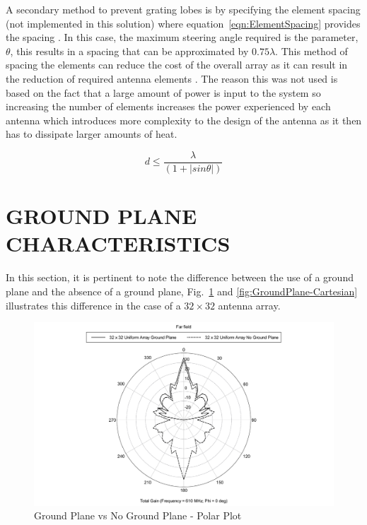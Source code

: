 \documentclass[11pt]{witseiepaper}
\begin{document}
\begin{bibunit}[witseie]
A secondary method to prevent grating lobes is by specifying the element spacing (not implemented in this solution) where equation~\ref{eqn:ElementSpacing} provides the spacing \cite[p.~331]{radarHandbook}. In this case, the maximum steering angle required is the parameter, $\theta$, this results in a spacing that can be approximated by $0.75 \lambda$. 
This method of spacing the elements can reduce the cost of the overall array as it can result in the reduction of required antenna elements \cite[p.~331]{radarHandbook}.
The reason this was not used is based on the fact that a large amount of power is input to the system so increasing the number of elements increases the power experienced by each antenna which introduces more complexity to the design of the antenna as it then has to dissipate larger amounts of heat.

\begin{equation} \label{eqn:ElementSpacing}
d \leq \frac{\lambda}{(1 + | sin \theta |)}
\end{equation}


\section{GROUND PLANE CHARACTERISTICS} \label{sec:GroundPlaneCharacteristics}
In this section, it is pertinent to note the difference between the use of a ground plane and the absence of a ground plane, Fig.~\ref{fig:GroundPlane-Polar} and \ref{fig:GroundPlane-Cartesian}  illustrates this difference in the case of a $32 \times 32$ antenna array.

\begin{figure}[htb]
    \centering
    \includegraphics[width=\linewidth]{GroundPlane-Polar.pdf}
    \caption{Ground Plane vs No Ground Plane - Polar Plot}
    \label{fig:GroundPlane-Polar}
\end{figure}


\end{bibunit}
\end{document}
